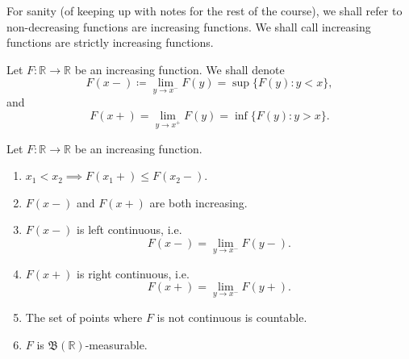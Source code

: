\documentclass[notoc,notitlepage]{tufte-book}
\begin{document}
\begin{note}
  For sanity (of keeping up with notes for the rest of the course),
  we shall refer to non-decreasing functions are increasing functions.
  We shall call increasing functions are strictly increasing functions.
\end{note}

\begin{notation}
  Let $F : \mathbb{R} \to \mathbb{R}$ be an increasing function.
  We shall denote
  \begin{equation*}
    F(x-) \coloneqq \lim_{y \to x^-} F(y) = \sup \{ F(y) : y < x \},
  \end{equation*}
  and
  \begin{equation*}
    F(x+) = \lim_{y \to x^+} F(y) = \inf \{ F(y) : y > x \}.
  \end{equation*}
\end{notation}

\begin{propo}\label{propo:properties_of_f_x_plus_and_f_x_minus}
  Let $F : \mathbb{R} \to \mathbb{R}$ be an increasing function.
  \begin{enumerate}
    \item $x_1 < x_2 \implies F(x_1+) \leq F(x_2-)$.
    \item $F(x-)$ and $F(x+)$ are both increasing.
    \item $F(x-)$ is left continuous, i.e.
      \begin{equation*}
        F(x-) = \lim_{y \to x^-} F(y-).
      \end{equation*}
    \item $F(x+)$ is right continuous, i.e.
      \begin{equation*}
        F(x+) = \lim_{y \to x^-} F(y+).
      \end{equation*}
    \item The set of points where $F$ is not continuous is countable.
    \item $F$ is $\mathfrak{B}(\mathbb{R})$-measurable.
  \end{enumerate}
\end{propo}
\end{document}
